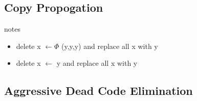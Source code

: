 



\subsection{Copy Propogation}

\begin{note}{notes}
\begin{itemize}
    \item  delete x $\gets \Phi$ (y,y,y) and replace all x with y
    \item delete x $\gets$ y and replace all x with y
\end{itemize}
\end{note}



\subsection{Aggressive Dead Code Elimination}

